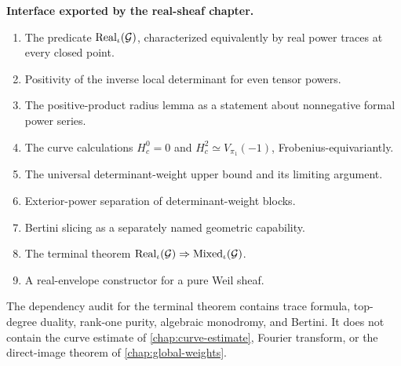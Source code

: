 \begin{formalization}
\label{form:real-sheaf-interface}
\textbf{Interface exported by the real-sheaf chapter.}

\begin{enumerate}
\item The predicate \(\operatorname{Real}_\iota(\mathcal G)\), characterized
equivalently by real power traces at every closed point.
\item Positivity of the inverse local determinant for even tensor powers.
\item The positive-product radius lemma as a statement about
nonnegative formal power series.
\item The curve calculations \(H_c^0=0\) and
\(H_c^2\simeq V_{\pi_1}(-1)\), Frobenius-equivariantly.
\item The universal determinant-weight upper bound and its limiting
argument.
\item Exterior-power separation of determinant-weight blocks.
\item Bertini slicing as a separately named geometric capability.
\item The terminal theorem
\(\operatorname{Real}_\iota(\mathcal G)\Rightarrow
\operatorname{Mixed}_\iota(\mathcal G)\).
\item A real-envelope constructor for a pure Weil sheaf.
\end{enumerate}

The dependency audit for the terminal theorem contains trace formula,
top-degree duality, rank-one purity, algebraic monodromy, and Bertini.  It
does not contain the curve estimate of \cref{chap:curve-estimate}, Fourier
transform, or the direct-image theorem of
\cref{chap:global-weights}.
\end{formalization}



